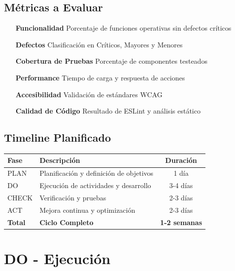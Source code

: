 \documentclass[12pt,a4paper]{report}
\begin{document}
\section{Métricas a Evaluar}

\begin{itemize}
    \item[\textcolor{cafeOscuro}{\textbf{Funcionalidad}}] Porcentaje de funciones operativas sin defectos críticos
    \item[\textcolor{cafeOscuro}{\textbf{Defectos}}] Clasificación en Críticos, Mayores y Menores
    \item[\textcolor{cafeOscuro}{\textbf{Cobertura de Pruebas}}] Porcentaje de componentes testeados
    \item[\textcolor{cafeOscuro}{\textbf{Performance}}] Tiempo de carga y respuesta de acciones
    \item[\textcolor{cafeOscuro}{\textbf{Accesibilidad}}] Validación de estándares WCAG
    \item[\textcolor{cafeOscuro}{\textbf{Calidad de Código}}] Resultado de ESLint y análisis estático
\end{itemize}

\section{Timeline Planificado}

\begin{table}[h]
    \centering
    \begin{tabular}{|l|p{6cm}|c|}
        \hline
        \rowcolor{grisClaro}
        \textbf{Fase} & \textbf{Descripción} & \textbf{Duración} \\
        \hline
        PLAN & Planificación y definición de objetivos & 1 día \\
        \hline
        DO & Ejecución de actividades y desarrollo & 3-4 días \\
        \hline
        CHECK & Verificación y pruebas & 2-3 días \\
        \hline
        ACT & Mejora continua y optimización & 2-3 días \\
        \hline
        \rowcolor{grisClaro}
        \textbf{Total} & \textbf{Ciclo Completo} & \textbf{1-2 semanas} \\
        \hline
    \end{tabular}
\end{table}

\chapter{DO - Ejecución}
\end{document}
